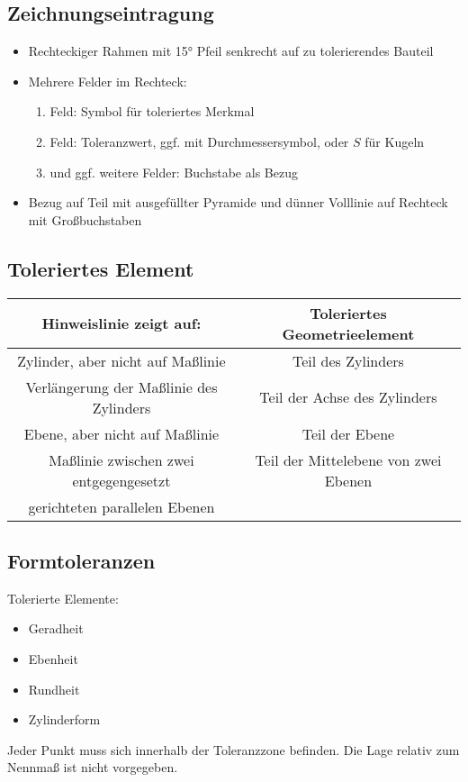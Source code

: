 \documentclass[a4paper,parskip=half*,DIV=7,fontsize=11pt]{scrartcl}
\begin{document}
\subsection{Zeichnungseintragung}
\begin{itemize}
	\item Rechteckiger Rahmen mit 15° Pfeil senkrecht auf zu tolerierendes Bauteil
	\item Mehrere Felder im Rechteck:
	      \begin{enumerate}
	      	\item Feld: Symbol für toleriertes Merkmal
	      	\item Feld: Toleranzwert, ggf. mit Durchmessersymbol, oder $S$ für Kugeln
	      	\item und ggf. weitere Felder: Buchstabe als Bezug
	      \end{enumerate}
	\item Bezug auf Teil mit ausgefüllter Pyramide und dünner Volllinie auf Rechteck mit Großbuchstaben
\end{itemize}

\subsection{Toleriertes Element}
\begin{tabular}{|c|c|}
	\hline
	\textbf{Hinweislinie zeigt auf:} & \textbf{Toleriertes Geometrieelement}\\
	\hline
	Zylinder, aber nicht auf Maßlinie & Teil des Zylinders\\
	\hline
	Verlängerung der Maßlinie des Zylinders & Teil der Achse des Zylinders\\
	\hline
	Ebene, aber nicht auf Maßlinie & Teil der Ebene\\
	\hline
	Maßlinie zwischen zwei entgegengesetzt & Teil der Mittelebene von zwei Ebenen \\ gerichteten parallelen Ebenen & \\
	\hline
\end{tabular}
	
\subsection{Formtoleranzen}
Tolerierte Elemente:
\begin{itemize}
	\item Geradheit
	\item Ebenheit
	\item Rundheit
	\item Zylinderform
\end{itemize}
Jeder Punkt muss sich innerhalb der Toleranzzone befinden. Die Lage relativ zum Nennmaß ist nicht vorgegeben.
	
\end{document}
